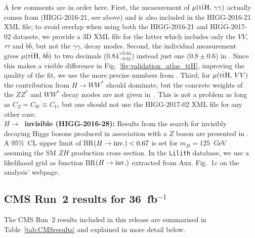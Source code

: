 A few comments are in order here. First, the measurement of $\mu({\rm t\bar tH},\,\gamma\gamma)$ actually comes from 
\cite{Aaboud:2018xdt} (HIGG-2016-21, see above) and is also included in the HIGG-2016-21 XML file; 
to avoid overlap when using both the HIGG-2016-21 and HIGG-2017-02 datasets, we provide a 3D XML file for the latter 
which includes only the $VV$, $\tau\tau$ and $b\bar b$, but not the $\gamma\gamma$, decay modes. 
Second, the individual measurement \cite{Aaboud:2017rss} gives $\mu({\rm t\bar tH},\,b\bar b)$ to two decimals 
($0.84^{+0.64}_{-0.61}$) instead just one ($0.8\pm 0.6$) in \cite{Aaboud:2017jvq}. Since this makes a visible difference 
in Fig.~\ref{fig:validation_atlas_ttH}, improving the quality of the fit, we use the more precise numbers from  \cite{Aaboud:2017rss}. 
Third, for $\mu({\rm t\bar tH},\,VV)$ the contribution from $H\to WW^*$ should dominate, but the concrete weights of the 
$ZZ^*$ and $WW^*$ decay modes are not given in~\cite{Aaboud:2017jvq}. This is not a problem as long as $C_Z=C_W\equiv C_V$, but one should 
not use the HIGG-2017-02 XML file for any other case.\\

{\bf\boldmath $H\to$~invisible (HIGG-2016-28):} 
Results from the search for invisibly decaying Higgs bosons produced in association with a $Z$ boson are presented in \cite{Aaboud:2017bja}. 
A 95\%~CL upper limit of BR$(H\to {\rm inv.})<0.67$ is set for $m_H= 125$~GeV assuming the SM $ZH$ production cross section. 
In the {\tt Lilith} database, 
we use a likelihood grid as function BR$(H\to {\rm inv.})$ extracted from Aux. Fig.~1c on the analysis' webpage. \\



\clearpage
\subsection{CMS Run~2 results for 36~fb$^{-1}$}

The CMS Run~2 results included in this release are summarised in Table~\ref{tab:CMSresults} and explained in more detail below.

